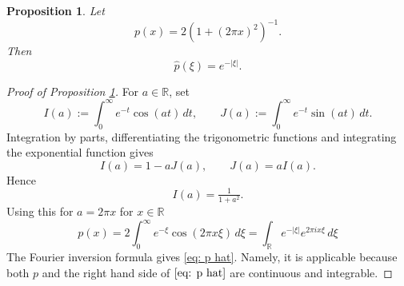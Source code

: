 \documentclass[12pt,reqno]{amsart}
\theoremstyle{plain}
\newtheorem{proposition}[theorem]{Proposition}
\numberwithin{equation}{section}
\theoremstyle{remark}
\newcommand{\uses}[1]{}
\newcommand{\usesdefs}[1]{}
\newcommand{\R}{{\mathbb R}}
\begin{document}
\begin{proposition}\label{poisson to abel}\uses{}\usesdefs{}
Let
\begin{equation}\label{auto:Gaussian-comparison-function}
    p(x)=2(1+(2\pi x)^2)^{-1}.
\end{equation}
Then
\begin{equation}\label{eq: p hat}
    \widehat{p}(\xi)=e^{- |\xi|}.
\end{equation}
\end{proposition}
\begin{proof}[Proof of Proposition \ref{poisson to abel}]
For \(a\in\R\), set
\[
    I(a):=\int_0^\infty e^{-t}\cos(at)\,dt,
    \qquad
    J(a):=\int_0^\infty e^{-t}\sin(at)\,dt.
\]
Integration by parts, differentiating the trigonometric functions and integrating the exponential function gives
\[
    I(a)=1-aJ(a),
    \qquad
    J(a)=aI(a).
\]
Hence
\[
    I(a)=\tfrac{1}{1+a^2}.
\]
Using this for $a=2\pi x$ for \(x\in\R\)
\begin{equation}
    p(x)=2\int_0^\infty e^{-\xi}\cos(2\pi x\xi)\,d\xi  =\int_{\R}e^{-|\xi|}e^{2\pi i x\xi}\,d\xi
\end{equation}
 The Fourier inversion formula gives \eqref{eq: p hat}. Namely, it is applicable because
 both $p$ and the right hand side of $\eqref{eq: p hat}$ are continuous and integrable.

\end{proof}
\end{document}
